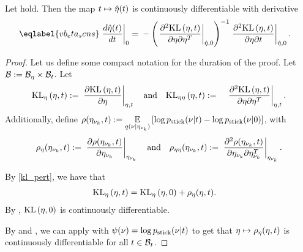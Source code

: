 \begin{thm}
%
Let  hold.  Then the map $t \mapsto
\hat\eta(t)$ is continuously differentiable with derivative
%
\begin{align}\eqlabel{vb_eta_sens}
%
\fracat{d \etaopt(\t)}{d \t}{0} ={}&
    - \left( \fracat{\partial^2 \KL{\eta, \t}}
                    {\partial \eta \partial \eta^T}
                    {\etaopt, 0} \right)^{-1}
    \fracat{\partial^2 \KL{\eta, \t}}
           {\partial \eta \partial \t}
           {\etaopt, 0}.
%
\end{align}
%
%
\begin{proof}
%
Let us define some compact notation for the duration of the proof. Let $\mathcal{B} :=
\mathcal{B}_\eta \times \mathcal{B}_t$.  Let
%
\begin{align*}
%
\KLgrad{\eta, \t} :={}&
    \fracat{\partial \KL{\eta, \t}}{\partial \eta}{\eta, \t}
\mathtxt{and}
\KLhess{\eta, \t} :={}&
    \fracat{\partial^2 \KL{\eta, \t}}
           {\partial \eta \partial \eta^T}{\eta, \t}.
%
\end{align*}
%
Additionally, define $\rho(\eta_{\nu_{k}}, t) :={} \underset{q(\nu \vert \eta_{\nu_{k}})}{\mathbb{E}}\left[\log
p_{\mathrm{stick}}(\nu \vert t) - \log p_{\mathrm{stick}}(\nu \vert 0)\right]$, with
%
\begin{align*}
%
\rho_\eta(\etanuk, \t) :={}
\fracat{\partial \rho(\etanuk, \t)}
       {\partial \etanuk}{\etanuk} \mathand
\rho_{\eta\eta}(\etanuk, \t) :={}
   \fracat{\partial^2 \rho(\etanuk, \t)}
          {\partial \etanuk \partial \etanuk^T}{\etanuk}.
%
\end{align*}

By \eqref{kl_pert}, we have that
%
\begin{align*}
%
\KLgrad{\eta, \t} ={}& \KLgrad{\eta, 0} + \rho_\eta(\eta, \t).
%
\end{align*}
%
By , $\mathrm{KL}\left(\eta, 0\right)$ is continuously
differentiable.

By  and
, we can apply
 with $\psi(\nu) = \log p_{\mathrm{stick}}(\nu \vert t)$ to get
that $\eta \mapsto \rho_\eta(\eta, t)$ is continuously differentiable for all
$t \in \mathcal{B}_t$.


\end{proof}
\end{thm}
